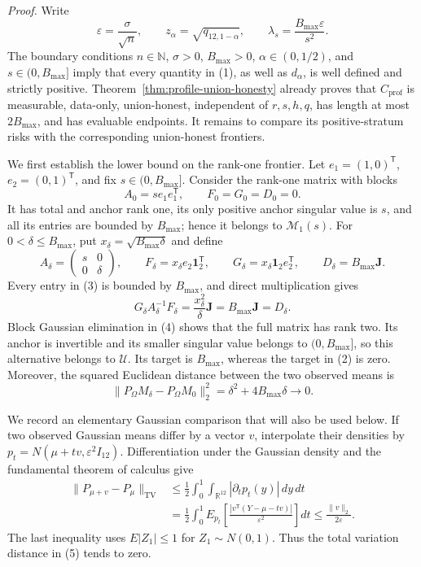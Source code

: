 \textit{Proof.}
Write
\[
 \varepsilon=\frac{\sigma}{\sqrt n},\qquad
 z_\alpha=\sqrt{q_{12,1-\alpha}},\qquad
 \lambda_s=\frac{B_{\max}\varepsilon}{s^2}.
\tag{1}
\]
The boundary conditions \(n\in\mathbb N\), \(\sigma>0\), \(B_{\max}>0\), \(\alpha\in(0,1/2)\), and \(s\in(0,B_{\max}]\) imply that every quantity in (1), as well as \(d_\alpha\), is well defined and strictly positive.  Theorem~\ref{thm:profile-union-honesty} already proves that \(C_{\mathrm{prof}}\) is measurable, data-only, union-honest, independent of \(r,s,h,q\), has length at most \(2B_{\max}\), and has evaluable endpoints.  It remains to compare its positive-stratum risks with the corresponding union-honest frontiers.

We first establish the lower bound on the rank-one frontier.  Let \(e_1=(1,0)^{\mathsf T}\), \(e_2=(0,1)^{\mathsf T}\), and fix \(s\in(0,B_{\max}]\).  Consider the rank-one matrix with blocks
\[
 A_0=se_1e_1^{\mathsf T},\qquad F_0=G_0=D_0=0.
\tag{2}
\]
It has total and anchor rank one, its only positive anchor singular value is \(s\), and all its entries are bounded by \(B_{\max}\); hence it belongs to \(\mathcal M_1(s)\).  For \(0<\delta\leq B_{\max}\), put \(x_\delta=\sqrt{B_{\max}\delta}\) and define
\[
 A_\delta=\begin{pmatrix}s&0\\0&\delta\end{pmatrix},\qquad
 F_\delta=x_\delta e_2\mathbf1_2^{\mathsf T},\qquad
 G_\delta=x_\delta\mathbf1_2e_2^{\mathsf T},\qquad
 D_\delta=B_{\max}\mathbf J.
\tag{3}
\]
Every entry in (3) is bounded by \(B_{\max}\), and direct multiplication gives
\[
 G_\delta A_\delta^{-1}F_\delta
 =\frac{x_\delta^2}{\delta}\mathbf J
 =B_{\max}\mathbf J=D_\delta.
\tag{4}
\]
Block Gaussian elimination in (4) shows that the full matrix has rank two.  Its anchor is invertible and its smaller singular value belongs to \((0,B_{\max}]\), so this alternative belongs to \(\mathcal U\).  Its target is \(B_{\max}\), whereas the target in (2) is zero.  Moreover, the squared Euclidean distance between the two observed means is
\[
 \lVert P_\Omega M_\delta-P_\Omega M_0\rVert_2^2
 =\delta^2+4B_{\max}\delta\longrightarrow0.
\tag{5}
\]

We record an elementary Gaussian comparison that will also be used below.  If two observed Gaussian means differ by a vector \(v\), interpolate their densities by \(p_t=N(\mu+tv,\varepsilon^2I_{12})\).  Differentiation under the Gaussian density and the fundamental theorem of calculus give
\[
 \begin{split}
 \lVert P_{\mu+v}-P_\mu\rVert_{\mathrm{TV}}
 &\leq\frac12\int_0^1\int_{\mathbb R^{12}}|\partial_tp_t(y)|\,dy\,dt\\
 &=\frac12\int_0^1E_{p_t}\left[
 \frac{|v^{\mathsf T}(Y-\mu-tv)|}{\varepsilon^2}\right]dt
 \leq\frac{\lVert v\rVert_2}{2\varepsilon}.
 \end{split}
\tag{6}
\]
The last inequality uses \(E|Z_1|\leq1\) for \(Z_1\sim N(0,1)\).  Thus the total variation distance in (5) tends to zero.

